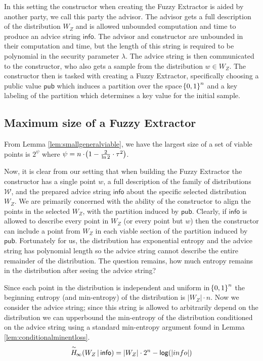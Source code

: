 In this setting the constructor when creating the Fuzzy Extractor is aided by another party, we call this party the advisor. 
The advisor gets a full description of the distribution $W_Z$ and is allowed unbounded computation and time to produce an advice string $\mathsf{info}$. 
The advisor and constructor are unbounded in their computation and time, but the length of this string is required to be polynomial in the security parameter $\lambda$. 
The advice string is then communicated to the constructor, who also gets a sample from the distribution $w \in W_Z$. 
The constructor then is tasked with creating a Fuzzy Extractor, specifically choosing a public value $\mathsf{pub}$ which induces a partition over the space $\!\left\{ 0,1 \right\}^{n}$ and a key labeling of the partition which determines a key value for the initial sample.

\subsection{Maximum size of a Fuzzy Extractor}
From Lemma \ref{lem:smallgeneralviable}, we have the largest size of a set of viable points is $2^{\psi}$ where $\psi = n \cdot \!\left(1 - \frac{2}{\ln{2}} \cdot \tau^{2}\right)$.

Now, it is clear from our setting that when building the Fuzzy Extractor the constructor has a single point $w$, a full description of the family of distributions $\mathcal{W}$, and the prepared advice string $\mathsf{info}$ about the specific selected distribution $W_Z$. 
We are primarily concerned with the ability of the constructor to align the points in the selected $W_Z$, with the partition induced by $\mathsf{pub}$. 
Clearly, if $\mathsf{info}$ is allowed to describe every point in $W_Z$ (or every point but $w$) then the constructor can include a point from $W_Z$ in each viable section of the partition induced by $\mathsf{pub}$. 
Fortunately for us, the distribution has exponential entropy and the advice string has polynomial length so the advice string cannot describe the entire remainder of the distribution. 
The question remains, how much entropy remains in the distribution after seeing the advice string? 

Since each point in the distribution is independent and uniform in $\!\left\{ 0,1 \right\}^{n}$ the beginning  entropy (and min-entropy) of the distribution is $|W_Z| \cdot n$. 
Now we consider the advice string; since this string is allowed to arbitrarily depend on the distribution we can upperbound the min-entropy of the distribution conditioned on the advice string using a standard min-entropy argument found in Lemma \ref{lem:conditionalminentloss}. 
\[
    \overset{\sim}{H}\!_{\infty}\!\left(W_Z\,|\,\mathsf{info}\right) = |W_Z| \cdot 2^n - \mathsf{log}\!\left(|info|\right)
\]